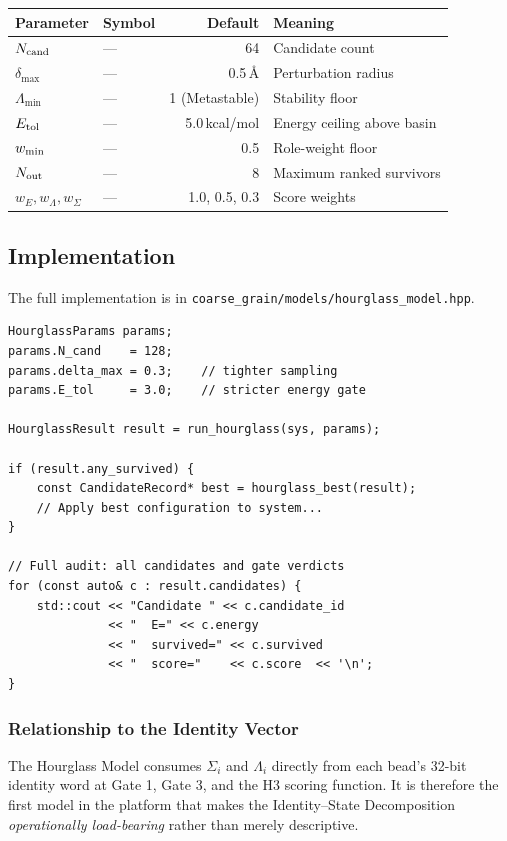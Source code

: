 \documentclass[11pt, a4paper, oneside]{article}
\theoremstyle{definition}
\newcommand{\file}[1]{\texttt{#1}}
\begin{document}
\begin{center}
\begin{tabular}{llrl}
\toprule
Parameter & Symbol & Default & Meaning \\
\midrule
$N_{\rm cand}$ & — & 64 & Candidate count \\
$\delta_{\max}$ & — & 0.5\,\AA & Perturbation radius \\
$\Lambda_{\min}$ & — & 1 (Metastable) & Stability floor \\
$E_{\rm tol}$ & — & 5.0\,kcal/mol & Energy ceiling above basin \\
$w_{\rm min}$ & — & 0.5 & Role-weight floor \\
$N_{\rm out}$ & — & 8 & Maximum ranked survivors \\
$w_E, w_\Lambda, w_\Sigma$ & — & 1.0, 0.5, 0.3 & Score weights \\
\bottomrule
\end{tabular}
\end{center}

\subsection{Implementation}

The full implementation is in
\file{coarse\_grain/models/hourglass\_model.hpp}.

\begin{lstlisting}
HourglassParams params;
params.N_cand    = 128;
params.delta_max = 0.3;    // tighter sampling
params.E_tol     = 3.0;    // stricter energy gate

HourglassResult result = run_hourglass(sys, params);

if (result.any_survived) {
    const CandidateRecord* best = hourglass_best(result);
    // Apply best configuration to system...
}

// Full audit: all candidates and gate verdicts
for (const auto& c : result.candidates) {
    std::cout << "Candidate " << c.candidate_id
              << "  E=" << c.energy
              << "  survived=" << c.survived
              << "  score="    << c.score  << '\n';
}
\end{lstlisting}

\subsubsection{Relationship to the Identity Vector}

The Hourglass Model consumes $\Sigma_i$ and $\Lambda_i$ directly from
each bead's 32-bit identity word at Gate 1, Gate 3, and the H3 scoring
function.  It is therefore the first model in the platform that makes
the Identity–State Decomposition \emph{operationally load-bearing}
rather than merely descriptive.
\end{document}
